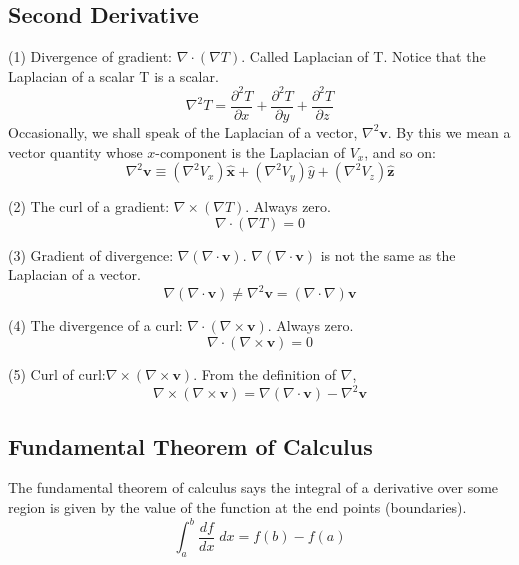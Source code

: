 \documentclass[../main.tex]{subfiles}
\begin{document}
\subsection{Second Derivative}

(1) Divergence of gradient: $\nabla \cdot (\nabla T)$. 
Called Laplacian of T. Notice that the Laplacian of a scalar T is a scalar. 
\begin{equation*}
    \nabla^2 T=\frac{\partial^2T}{\partial x}+\frac{\partial^2T}{\partial y}+\frac{\partial^2T}{\partial z}
\end{equation*}
Occasionally, we shall speak of the Laplacian of a vector, $\nabla ^2  \mathbf{v}$. By this we mean a vector quantity whose $x$-component is the Laplacian of $V_x$, and so on:
\begin{equation*}
    \nabla^2 \mathbf{v} \equiv (\nabla^2 V_x ) \mathbf{\hat{x}} + (\nabla^2 V_y)\hat{y} + (\nabla^2 V_z ) \mathbf{\hat{z}}
\end{equation*}

(2) The curl of a gradient: $\nabla \times (\nabla T)$. Always zero.
\begin{equation*}
    \nabla \cdot (\nabla T)=0
\end{equation*}

(3) Gradient of divergence: $\nabla  (\nabla \cdot  \mathbf{v})$. 
$\nabla  (\nabla \cdot  \mathbf{v})$ is not the same as the Laplacian of a vector.
\begin{equation*}
    \nabla  (\nabla \cdot  \mathbf{v}) \neq \nabla^2  \mathbf{v} = (\nabla \cdot \nabla)  \mathbf{v} 
\end{equation*}

(4) The divergence of a curl: $\nabla  \cdot (\nabla \times  \mathbf{v})$. Always zero.
\begin{equation*}
    \nabla \cdot (\nabla \times  \mathbf{v})=0
\end{equation*}

(5) Curl of curl:$\nabla \times (\nabla \times  \mathbf{v})$. From the definition of $\nabla$, 
\begin{equation*}
    \nabla \times (\nabla \times  \mathbf{v})=\nabla (\nabla \cdot  \mathbf{v})-\nabla^2 \mathbf{v}
\end{equation*}

\subsection{Fundamental Theorem of Calculus}
The fundamental theorem of calculus says the integral of a derivative over some region is given by the value of the function at the end points (boundaries). 
\begin{equation*}
    \int_{a}^{b} \frac{df}{dx}\;dx=f(b)-f(a)
\end{equation*}
\end{document}
